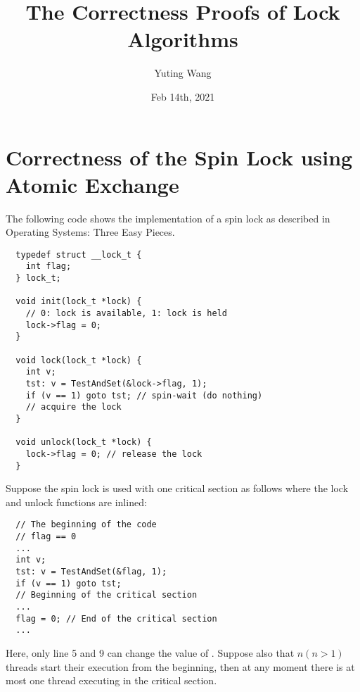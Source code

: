 \documentclass{article}[10pt]
\title{The Correctness Proofs of Lock Algorithms}
\author{Yuting Wang}
\date{Feb 14th, 2021}
\begin{document}
\maketitle

\section{Correctness of the Spin Lock using Atomic Exchange}
\label{sec:spin-lock-xchg}

\begin{mythm}
\label{thm:spin-lock-correct-xchg}

The following code shows the implementation of a spin lock as
described in Operating Systems: Three Easy Pieces.
%
\begin{lstlisting}
  typedef struct __lock_t {
    int flag;
  } lock_t;

  void init(lock_t *lock) {
    // 0: lock is available, 1: lock is held
    lock->flag = 0;
  }

  void lock(lock_t *lock) {
    int v;
    tst: v = TestAndSet(&lock->flag, 1);
    if (v == 1) goto tst; // spin-wait (do nothing)
    // acquire the lock
  }

  void unlock(lock_t *lock) {
    lock->flag = 0; // release the lock
  }  
\end{lstlisting}
%
Suppose the spin lock is used with one critical section as follows
where the lock and unlock functions are inlined:
%
\begin{lstlisting}
  // The beginning of the code
  // flag == 0
  ...
  int v;
  tst: v = TestAndSet(&flag, 1);
  if (v == 1) goto tst;
  // Beginning of the critical section
  ...
  flag = 0; // End of the critical section
  ...
\end{lstlisting}
%
Here, only line 5 and 9 can change the value of \kflag.
%
Suppose also that $n (n > 1)$ threads start their execution from the
beginning, then at any moment there is at most one thread executing in
the critical section.
\end{mythm}
%
\end{document}
